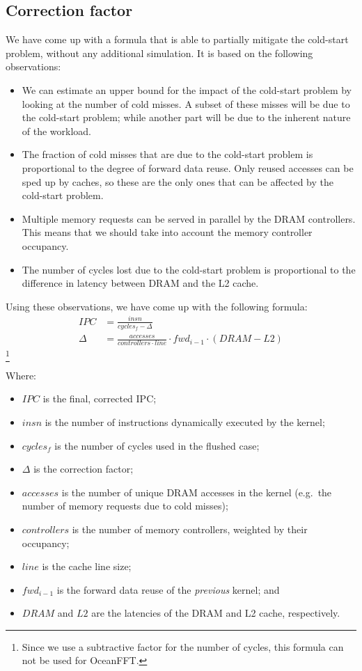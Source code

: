 \documentclass[5p,numvwe]{elsarticle}
\begin{document}
    \subsection{Correction factor}\label{subsec:mitig-corr}
    We have come up with a formula that is able to partially mitigate the cold-start problem, without any additional simulation.
    It is based on the following observations:
    \begin{itemize}
        \item We can estimate an upper bound for the impact of the cold-start problem by looking at the number of cold misses.
        A subset of these misses will be due to the cold-start problem; while another part will be due to the inherent nature of the workload.
        \item The fraction of cold misses that are due to the cold-start problem is proportional to the degree of forward data reuse.
        Only reused accesses can be sped up by caches, so these are the only ones that can be affected by the cold-start problem.
        \item Multiple memory requests can be served in parallel by the DRAM controllers.
        This means that we should take into account the memory controller occupancy.
        \item The number of cycles lost due to the cold-start problem is proportional to the difference in latency between DRAM and the L2 cache.
    \end{itemize}

    Using these observations, we have come up with the following formula:
    \begin{align}
        IPC &= \frac{insn}{cycles_f - \Delta} \\
        \Delta &= \frac{accesses}{controllers \cdot line} \cdot fwd_{i-1} \cdot (DRAM - L2)
    \end{align}\footnote{Since we use a subtractive factor for the number of cycles, this formula can not be used for OceanFFT.}

    Where:
    \begin{itemize}
        \item $IPC$ is the final, corrected IPC;
        \item $insn$ is the number of instructions dynamically executed by the kernel;
        \item $cycles_f$ is the number of cycles used in the flushed case;
        \item $\Delta$ is the correction factor;
        \item $accesses$ is the number of unique DRAM accesses in the kernel (e.g.\ the number of memory requests due to cold misses);
        \item $controllers$ is the number of memory controllers, weighted by their occupancy;
        \item $line$ is the cache line size;
        \item $fwd_{i-1}$ is the forward data reuse of the \textit{previous} kernel; and
        \item $DRAM$ and $L2$ are the latencies of the DRAM and L2 cache, respectively.
    \end{itemize}
\end{document}

